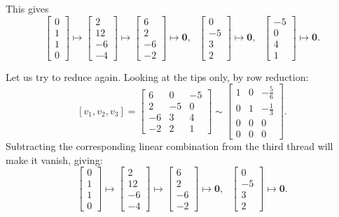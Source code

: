 \documentclass[12pt]{article}
\newcommand{\1}{\mathbf{1}}
\newcommand{\0}{\mathbf{0}}
\theoremstyle{definition}
\begin{document}
This gives
\[
\left[\begin{matrix}0\\1\\1\\0\end{matrix}\right]
\mapsto
\left[\begin{matrix}2\\12\\-6\\-4\end{matrix}\right]
\mapsto
\left[\begin{matrix}6\\2\\-6\\-2\end{matrix}\right]
\mapsto
\0
, \ \ \
\left[\begin{matrix}0\\-5\\3\\2\end{matrix}\right]
\mapsto
\0
, \ \ \
\left[\begin{matrix}-5\\0\\4\\1\end{matrix}\right]
\mapsto
\0
.
\]

Let us try to reduce again.
Looking at the tips only, by row reduction:
\[
[v_1, v_2,v_3] =
\left[\begin{matrix}6 & 0 & -5\\2 & -5 & 0\\-6 & 3 & 4\\-2 & 2 & 1\end{matrix}\right]
\sim
\left[\begin{matrix}1 & 0 & - \frac{5}{6}\\0 & 1 & - \frac{1}{3}\\0 & 0 & 0\\0 & 0 & 0\end{matrix}\right]
.
\]
Subtracting the corresponding linear combination from the third thread will make it vanish, giving:
\[
\left[\begin{matrix}0\\1\\1\\0\end{matrix}\right]
\mapsto
\left[\begin{matrix}2\\12\\-6\\-4\end{matrix}\right]
\mapsto
\left[\begin{matrix}6\\2\\-6\\-2\end{matrix}\right]
\mapsto
\0
, \ \ \
\left[\begin{matrix}0\\-5\\3\\2\end{matrix}\right]
\mapsto
\0
.
\]
\end{document}
